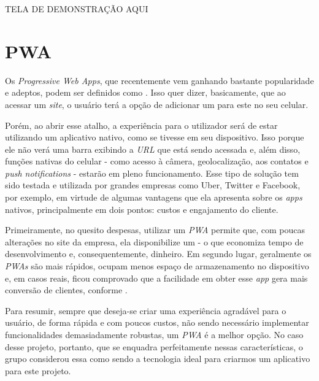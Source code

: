 {\huge TELA DE DEMONSTRAÇÃO AQUI}








\section{PWA}
\label{sec:pwa}

Os \textit{Progressive Web Apps}, que recentemente vem ganhando bastante popularidade e adeptos, podem ser definidos como \cite{Souza19} . Isso quer dizer, basicamente, que ao acessar um \textit{site}, o usuário terá a opção de adicionar um  para este no seu celular.

Porém, ao abrir esse atalho, a experiência para o utilizador será de estar utilizando um aplicativo nativo, como se tivesse  em seu dispositivo. Isso porque ele não verá uma barra exibindo a \textit{URL} que está sendo acessada e, além disso, funções nativas do celular - como acesso à câmera, geolocalização, aos contatos e \textit{push notifications} - estarão em pleno funcionamento. Esse tipo de solução tem sido testada e utilizada por grandes empresas como Uber, Twitter e Facebook, por exemplo, em virtude de algumas vantagens que ela apresenta sobre os \textit{apps} nativos, principalmente em dois pontos: custos e engajamento do cliente.


Primeiramente, no quesito despesas, utilizar um \textit{PWA} permite que, com poucas alterações no site da empresa, ela disponibilize um  - o que economiza tempo de desenvolvimento e, consequentemente, dinheiro. Em segundo lugar, geralmente os \textit{PWAs} são mais rápidos, ocupam menos espaço de armazenamento no dispositivo e, em casos reais, ficou comprovado que a facilidade em obter esse \textit{app} gera mais conversão de clientes, conforme \cite{Souza19} .

Para resumir, sempre que deseja-se criar uma experiência agradável para o usuário, de forma rápida e com poucos custos, não sendo necessário implementar funcionalidades demasiadamente robustas, um \textit{PWA} é a melhor opção. No caso desse projeto, portanto, que se enquadra perfeitamente nessas características, o grupo considerou essa como sendo a tecnologia ideal para criarmos um aplicativo para este projeto.


